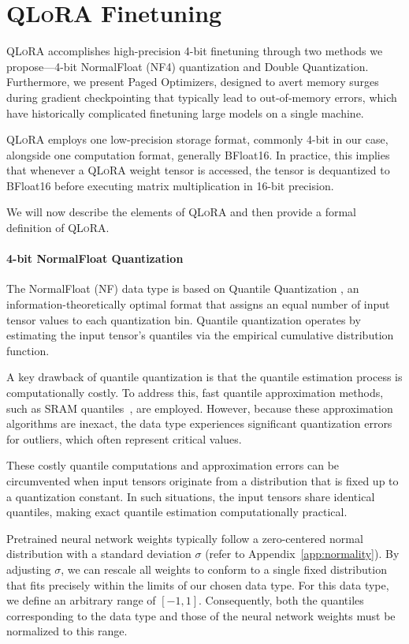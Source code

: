 \section{\textsc{QLoRA} Finetuning}

\textsc{QLoRA} accomplishes high-precision 4-bit finetuning through two methods we propose—4-bit NormalFloat (NF4) quantization and Double Quantization. Furthermore, we present Paged Optimizers, designed to avert memory surges during gradient checkpointing that typically lead to out-of-memory errors, which have historically complicated finetuning large models on a single machine.

\textsc{QLoRA} employs one low-precision storage format, commonly 4-bit in our case, alongside one computation format, generally BFloat16. In practice, this implies that whenever a \textsc{QLoRA} weight tensor is accessed, the tensor is dequantized to BFloat16 before executing matrix multiplication in 16-bit precision.

We will now describe the elements of \textsc{QLoRA} and then provide a formal definition of \textsc{QLoRA}.

\paragraph{4-bit NormalFloat Quantization} The NormalFloat (NF) data type is based on Quantile Quantization \citep{dettmers2022optimizers}, an information-theoretically optimal format that assigns an equal number of input tensor values to each quantization bin. Quantile quantization operates by estimating the input tensor’s quantiles via the empirical cumulative distribution function.

A key drawback of quantile quantization is that the quantile estimation process is computationally costly. To address this, fast quantile approximation methods, such as SRAM quantiles~\citep{dettmers2022optimizers}, are employed. However, because these approximation algorithms are inexact, the data type experiences significant quantization errors for outliers, which often represent critical values.

These costly quantile computations and approximation errors can be circumvented when input tensors originate from a distribution that is fixed up to a quantization constant. In such situations, the input tensors share identical quantiles, making exact quantile estimation computationally practical.

Pretrained neural network weights typically follow a zero-centered normal distribution with a standard deviation $\sigma$ (refer to Appendix~\ref{app:normality}). By adjusting $\sigma$, we can rescale all weights to conform to a single fixed distribution that fits precisely within the limits of our chosen data type. For this data type, we define an arbitrary range of $[-1, 1]$. Consequently, both the quantiles corresponding to the data type and those of the neural network weights must be normalized to this range.

